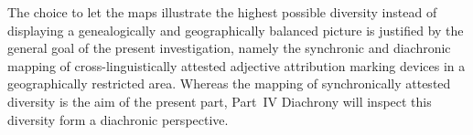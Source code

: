 The choice to let the maps illustrate the highest possible diversity instead of displaying a genealogically and geographically balanced picture is justified by the general goal of the present investigation, namely the synchronic and diachronic mapping of cross-linguistically attested adjective attribution marking devices in a geographically restricted area. Whereas the mapping of synchronically attested diversity is the aim of the present part, Part~IV Diachrony will inspect this diversity form a diachronic perspective.
